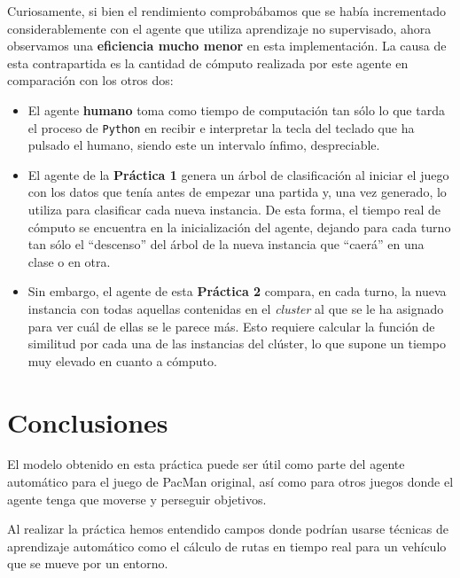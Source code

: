 \documentclass[12pt]{article}
\begin{document}
Curiosamente, si bien el rendimiento comprobábamos que se había incrementado considerablemente con el agente que utiliza aprendizaje no supervisado, ahora observamos una \textbf{eficiencia mucho menor} en esta implementación. La causa de esta contrapartida es la cantidad de cómputo realizada por este agente en comparación con los otros dos:
\begin{itemize}
    \item El agente \textbf{humano} toma como tiempo de computación tan sólo lo que tarda el proceso de \texttt{Python} en recibir e interpretar la tecla del teclado que ha pulsado el humano, siendo este un intervalo ínfimo, despreciable.
    \item El agente de la \textbf{Práctica 1} genera un árbol de clasificación al iniciar el juego con los datos que tenía antes de empezar una partida y, una vez generado, lo utiliza para clasificar cada nueva instancia. De esta forma, el tiempo real de cómputo se encuentra en la inicialización del agente, dejando para cada turno tan sólo el ``descenso'' del árbol de la nueva instancia que ``caerá'' en una clase o en otra.
    \item Sin embargo, el agente de esta \textbf{Práctica 2} compara, en cada turno, la nueva instancia con todas aquellas contenidas en el \textit{cluster} al que se le ha asignado para ver cuál de ellas se le parece más. Esto requiere calcular la función de similitud por cada una de las instancias del clúster, lo que supone un tiempo muy elevado en cuanto a cómputo.
\end{itemize}




\newpage
\section{Conclusiones}

El modelo obtenido en esta práctica puede ser útil como parte del agente automático para el juego de PacMan original, así como para otros juegos donde el agente tenga que moverse y perseguir objetivos.

Al realizar la práctica hemos entendido campos donde podrían usarse técnicas de aprendizaje automático como el cálculo de rutas en tiempo real para un vehículo que se mueve por un entorno.
\end{document}
